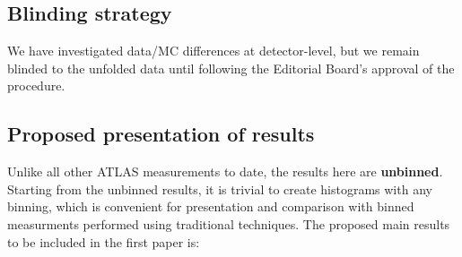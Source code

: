 \subsection{Blinding strategy}

We have investigated data/MC differences at detector-level, but we remain blinded to the unfolded data until following the Editorial Board's approval of the procedure.

\subsection{Proposed presentation of results}

Unlike all other ATLAS measurements to date, the results here are \textbf{unbinned}.
Starting from the unbinned results, it is trivial to create histograms with any binning, which is convenient for presentation and comparison with binned measurments performed using traditional techniques.
The proposed main results to be included in the first paper is:


